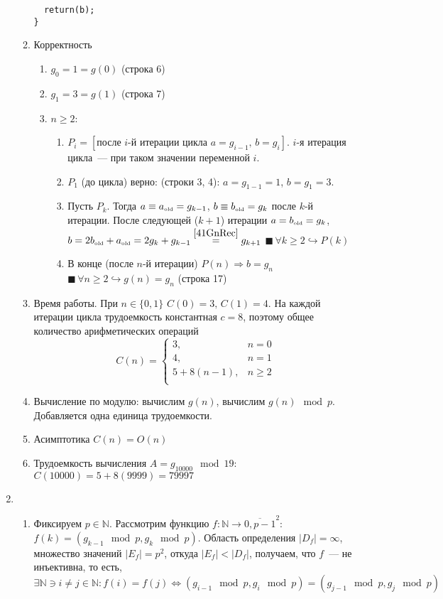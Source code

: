 \documentclass[a4paper]{article}
\newcommand{\NN}{\mathbb{N}}
\begin{document}
\begin{enumerate}
\begin{enumerate}
\begin{lstlisting}
  return(b);
}
\end{lstlisting}
\item Корректность\begin{enumerate}
\item $g_0=1=g(0)$ (строка 6)
\item $g_1=3=g(1)$ (строка 7)
\item $n\geqslant 2$:\begin{enumerate}
\item $P_i=\left[\mbox{после }i\mbox{-й итерации цикла }a=g_{i-1},\,b=g_i\right]$. $i$-я итерация цикла~--- при таком значении переменной $i$.
\item $P_1$ (до цикла) верно: (строки 3, 4): $a=g_{1-1}=1$, $b=g_1=3$.
\item Пусть $P_k$. Тогда $a\equiv a_{\mbox{\tiny old}}=g_{k-1}$, $b\equiv b_{\mbox{\tiny old}}=g_k$ после $k$-й итерации. После следующей ($k+1$) итерации $a=b_{\mbox{\tiny old}}=g_k$, $b=2b_{\mbox{\tiny old}}+a_{\mbox{\tiny old}}=2g_k+g_{k-1}\overset{\ref{41GnRec}}{=}g_{k+1}$ $\blacksquare\,\forall k\geqslant 2\hookrightarrow P(k)$
\item В конце (после $n$-й итерации) $P(n)\Rightarrow b=g_n$ $\blacksquare\,\forall n\geqslant 2\hookrightarrow g(n)=g_n$ (строка 17)
\end{enumerate}
\end{enumerate}
\item Время работы. При $n\in\{0,1\}$ $C(0)=3,\,C(1)=4$. На каждой итерации цикла трудоемкость константная $c=8$, поэтому общее количество арифметических операций $$C(n)=\begin{cases}
3, & n=0\\
4, & n=1\\
5+8(n-1), & n\geqslant 2\\
\end{cases}$$
\item Вычисление по модулю: вычислим $g(n)$, вычислим $g(n) \mod p$. Добавляется одна единица трудоемкости.
\item Асимптотика $C(n)=O(n)$
\item Трудоемкость вычисления $A=g_{10000}\mod 19$: $C(10000)=5+8(9999)=79997$
\end{enumerate}
\item \begin{enumerate}
\item Фиксируем $p\in\NN$. Рассмотрим функцию $f\colon \NN\to \overline{0,p-1}^2$: $f(k)=(g_{k-1}\mod p,g_k\mod p)$. Область определения $|D_f|=\infty$, множество значений $|E_f|=p^2$, откуда $|E_f|<|D_f|$, получаем, что $f$~--- не инъективна, то есть, $\exists \NN\ni i\neq j\in\NN \colon f(i)=f(j)\Leftrightarrow (g_{i-1}\mod p,g_i\mod p)=(g_{j-1}\mod p,g_j\mod p)$

\end{enumerate}
\end{enumerate}
\end{document}
